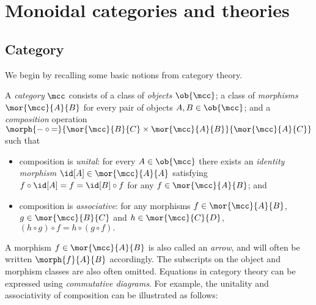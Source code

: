 \chapter{Monoidal categories and theories}

\section{Category}

We begin by recalling some basic notions from category theory.

\begin{definition}[Category]
    \label{def:category}
    A \emph{category} \(\mcc\) consists of a class of \emph{objects}
    \(\ob{\mcc}\); a class of \emph{morphisms} \(\mor{\mcc}{A}{B}\)
    for every pair of objects \(A, B \in \ob{\mcc}\); and a \emph{composition}
    operation \(
        \morph{
            {-} \circ {=}
        }{
            \mor{\mcc}{B}{C} \times \mor{\mcc}{A}{B}
        }{
            \mor{\mcc}{A}{C}
        }
    \) such that
    \begin{itemize}
        \item composition is \emph{unital}: for every \(
                    A \in \ob{\mcc}
                \) there exists an \emph{identity morphism} \(
                    \id[A] \in \mor{\mcc}{A}{A}
                \) satisfying \(
                    f \circ \id[A] = f = \id[B] \circ f
                \) for any \(
                    f \in \mor{\mcc}{A}{B}
                \); and
        \item composition is \emph{associative}: for any morphisms \(
                    f \in \mor{\mcc}{A}{B}
                \), \(
                    g \in \mor{\mcc}{B}{C}
                \) and \(h \in \mor{\mcc}{C}{D}\), \(
                    (h \circ g) \circ f = h \circ (g \circ f).
                \)
    \end{itemize}
\end{definition}

A morphism \(f \in \mor{\mcc}{A}{B}\) is also called an \emph{arrow}, and will
often be written \(\morph{f}{A}{B}\) accordingly.
The subscripts on the object and morphism classes are also often omitted.
Equations in category theory can be expressed using \emph{commutative diagrams}.
For example, the unitality and associativity of composition can be illustrated
as follows:

\begin{center}
    
    \quad
    
\end{center}

